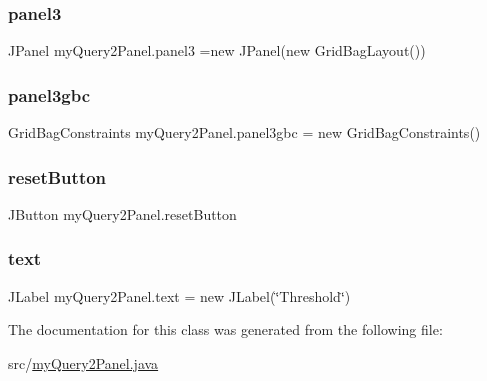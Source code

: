 \subsubsection{\texorpdfstring{panel3}{panel3}}
{\footnotesize\ttfamily J\+Panel my\+Query2\+Panel.\+panel3 =new J\+Panel(new Grid\+Bag\+Layout())\hspace{0.3cm}{\ttfamily [private]}}

\hypertarget{classmy_query2_panel_a361db8f93b44e873eaf71d0c1b7053ca}{}\label{classmy_query2_panel_a361db8f93b44e873eaf71d0c1b7053ca} 
\subsubsection{\texorpdfstring{panel3gbc}{panel3gbc}}
{\footnotesize\ttfamily Grid\+Bag\+Constraints my\+Query2\+Panel.\+panel3gbc = new Grid\+Bag\+Constraints()\hspace{0.3cm}{\ttfamily [private]}}

\hypertarget{classmy_query2_panel_a6a14902bb9074acd9cb34b7990caf5cb}{}\label{classmy_query2_panel_a6a14902bb9074acd9cb34b7990caf5cb} 
\subsubsection{\texorpdfstring{reset\+Button}{resetButton}}
{\footnotesize\ttfamily J\+Button my\+Query2\+Panel.\+reset\+Button\hspace{0.3cm}{\ttfamily [private]}}

\hypertarget{classmy_query2_panel_a7073a23d25ce19b57d706330db2ddd4f}{}\label{classmy_query2_panel_a7073a23d25ce19b57d706330db2ddd4f} 
\subsubsection{\texorpdfstring{text}{text}}
{\footnotesize\ttfamily J\+Label my\+Query2\+Panel.\+text = new J\+Label(\char`\"{}Threshold\char`\"{})\hspace{0.3cm}{\ttfamily [private]}}



The documentation for this class was generated from the following file\+:\begin{DoxyCompactItemize}
\item 
src/\hyperlink{my_query2_panel_8java}{my\+Query2\+Panel.\+java}\end{DoxyCompactItemize}
